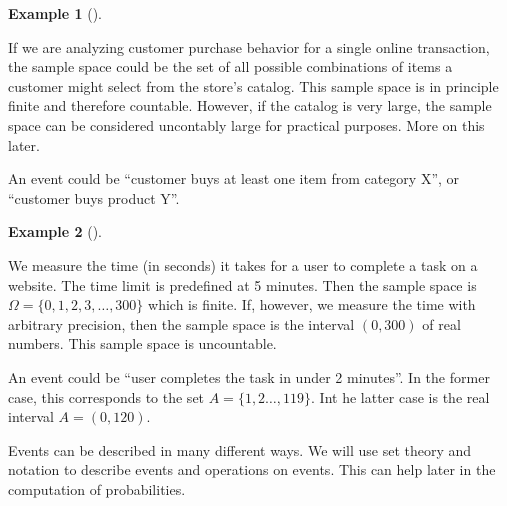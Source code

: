 \documentclass[
  letterpaper,
  DIV=11,
  numbers=noendperiod]{scrreport}
\theoremstyle{definition}
\newtheorem{example}{Example}[chapter]
\theoremstyle{plain}
\theoremstyle{definition}
\theoremstyle{plain}
\theoremstyle{remark}
\begin{document}
\begin{example}[]\protect\hypertarget{exm-2-1.1}{}\label{exm-2-1.1}

If we are analyzing customer purchase behavior for a single online
transaction, the sample space could be the set of all possible
combinations of items a customer might select from the store's catalog.
This sample space is in principle finite and therefore countable.
However, if the catalog is very large, the sample space can be
considered uncontably large for practical purposes. More on this later.

An event could be ``customer buys at least one item from category X'',
or ``customer buys product Y''.

\end{example}

\begin{example}[]\protect\hypertarget{exm-3-1.1}{}\label{exm-3-1.1}

We measure the time (in seconds) it takes for a user to complete a task
on a website. The time limit is predefined at 5 minutes. Then the sample
space is \(\Omega = \{0, 1, 2, 3,\ldots, 300\}\) which is finite. If,
however, we measure the time with arbitrary precision, then the sample
space is the interval \((0,300)\) of real numbers. This sample space is
uncountable.

An event could be ``user completes the task in under 2 minutes''. In the
former case, this corresponds to the set \(A=\{1,2\ldots, 119 \}\). Int
he latter case is the real interval \(A=(0, 120)\).

\end{example}

Events can be described in many different ways. We will use set theory
and notation to describe events and operations on events. This can help
later in the computation of probabilities.
\end{document}
